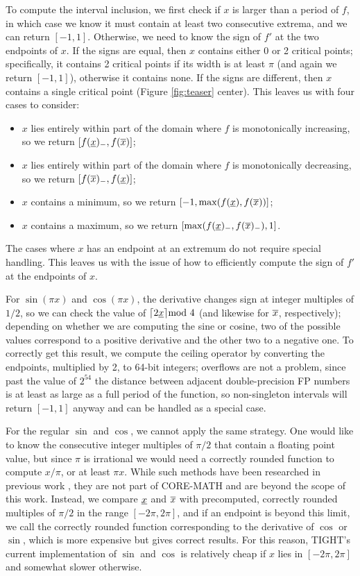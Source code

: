 To compute the interval inclusion, we first check if $x$ is larger than a period of $f$, in which case we know it must contain at least two consecutive extrema, and we can return $[-1,1]$.
Otherwise, we need to know the sign of $f'$ at the two endpoints of $x$.
If the signs are equal, then $x$ contains either 0 or 2 critical points; specifically, it contains 2 critical points if its width is at least $\pi$ (and again we return $[-1,1]$), otherwise it contains none.
If the signs are different, then $x$ contains a single critical point (Figure \ref{fig:teaser} center).
This leaves us with four cases to consider:
\begin{itemize}
	\item $x$ lies entirely within part of the domain where $f$ is monotonically increasing, so we return $[f(\underline{x})_-, f(\overline{x})]$;
	\item $x$ lies entirely within part of the domain where $f$ is monotonically decreasing, so we return $[f(\overline{x})_-, f(\underline{x})]$;
	\item $x$ contains a minimum, so we return $[-1, \max(f(\underline{x}), f(\overline{x}))]$;
	\item $x$ contains a maximum, so we return $[\max(f(\underline{x})_-, f(\overline{x})_-), 1]$.
\end{itemize}
The cases where $x$ has an endpoint at an extremum do not require special handling.
This leaves us with the issue of how to efficiently compute the sign of $f'$ at the endpoints of $x$.

For $\sin(\pi x)$ and $\cos(\pi x)$, the derivative changes sign at integer multiples of $1/2$, so we can check the value of $\lceil2\underline{x}\rceil\mathrm{mod}\ 4$ (and likewise for $\overline{x}$, respectively); depending on whether we are computing the sine or cosine, two of the possible values correspond to a positive derivative and the other two to a negative one.
To correctly get this result, we compute the ceiling operator by converting the endpoints, multiplied by 2, to 64-bit integers; overflows are not a problem, since past the value of $2^{54}$ the distance between adjacent double-precision FP numbers is at least as large as a full period of the function, so non-singleton intervals will return $[-1,1]$ anyway and can be handled as a special case.

For the regular $\sin$ and $\cos$, we cannot apply the same strategy. One would like to know the consecutive integer multiples of $\pi/2$ that contain a floating point value, but since $\pi$ is irrational we would need a correctly rounded function to compute $x/\pi$, or at least $\pi x$.
While such methods have been researched in previous work \cite{Brisebarre:2005}, they are not part of CORE-MATH and are beyond the scope of this work.
Instead, we compare $\underline{x}$ and $\overline{x}$ with precomputed, correctly rounded multiples of $\pi/2$ in the range $[-2\pi, 2\pi]$, and if an endpoint is beyond this limit, we call the correctly rounded function corresponding to the derivative of $\cos$ or $\sin$, which is more expensive but gives correct results.
For this reason, TIGHT's current implementation of $\sin$ and $\cos$ is relatively cheap if $x$ lies in $[-2\pi, 2\pi]$ and somewhat slower otherwise.

